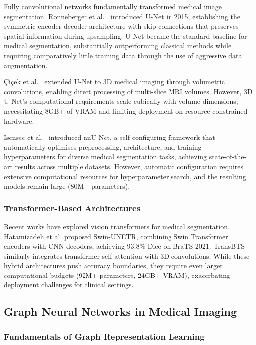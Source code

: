 Fully convolutional networks fundamentally transformed medical image segmentation. Ronneberger et al.\ \cite{ronneberger2015unet} introduced U-Net in 2015, establishing the symmetric encoder-decoder architecture with skip connections that preserves spatial information during upsampling. U-Net became the standard baseline for medical segmentation, substantially outperforming classical methods while requiring comparatively little training data through the use of aggressive data augmentation.

\c{C}i\c{c}ek et al.\ \cite{cicek20163d} extended U-Net to 3D medical imaging through volumetric convolutions, enabling direct processing of multi-slice MRI volumes. However, 3D U-Net's computational requirements scale cubically with volume dimensions, necessitating 8GB+ of VRAM and limiting deployment on resource-constrained hardware.

Isensee et al.\ \cite{isensee2021nnunet} introduced nnU-Net, a self-configuring framework that automatically optimises preprocessing, architecture, and training hyperparameters for diverse medical segmentation tasks, achieving state-of-the-art results across multiple datasets. However, automatic configuration requires extensive computational resources for hyperparameter search, and the resulting models remain large (80M+ parameters).

\subsubsection{Transformer-Based Architectures}

Recent works have explored vision transformers for medical segmentation. Hatamizadeh et al. \cite{hatamizadeh2022swin} proposed Swin-UNETR, combining Swin Transformer encoders with CNN decoders, achieving 93.8\% Dice on BraTS 2021. TransBTS \cite{wang2021transbts} similarly integrates transformer self-attention with 3D convolutions. While these hybrid architectures push accuracy boundaries, they require even larger computational budgets (92M+ parameters, 24GB+ VRAM), exacerbating deployment challenges for clinical settings.

\subsection{Graph Neural Networks in Medical Imaging}

\subsubsection{Fundamentals of Graph Representation Learning}

